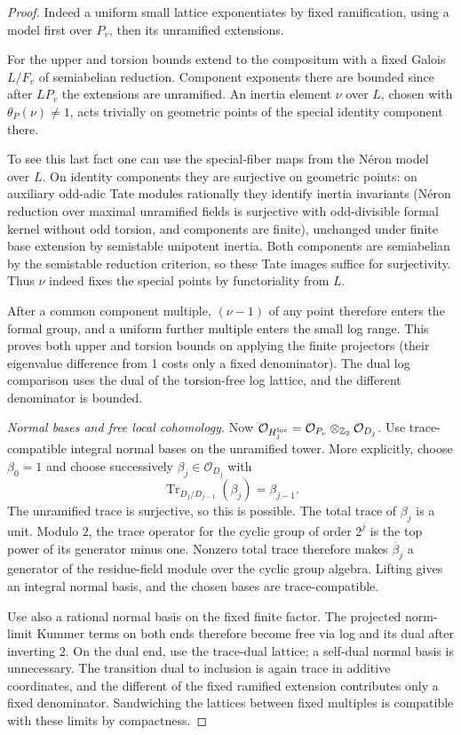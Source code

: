 \begin{proof}
Indeed a uniform small lattice exponentiates by fixed ramification, using a model first over \(P_v\), then its unramified extensions.

For the upper and torsion bounds extend to the compositum with a fixed Galois \(L/F_v\) of semiabelian reduction. Component exponents there are bounded since after \(LP_v\) the extensions are unramified. An inertia element \(\nu\) over \(L\), chosen with \(\theta_P(\nu)\ne1\), acts trivially on geometric points of the special identity component there.

To see this last fact one can use the special-fiber maps from the Néron model over \(L\). On identity components they are surjective on geometric points: on auxiliary odd-adic Tate modules rationally they identify inertia invariants (Néron reduction over maximal unramified fields is surjective with odd-divisible formal kernel without odd torsion, and components are finite), unchanged under finite base extension by semistable unipotent inertia. Both components are semiabelian by the semistable reduction criterion, so these Tate images suffice for surjectivity. Thus \(\nu\) indeed fixes the special points by functoriality from \(L\).

After a common component multiple, \((\nu-1)\) of any point therefore enters the formal group, and a uniform further multiple enters the small log range. This proves both upper and torsion bounds on applying the finite projectors (their eigenvalue difference from 1 costs only a fixed denominator). The dual log comparison uses the dual of the torsion-free log lattice, and the different denominator is bounded.

\smallskip\noindent\emph{Normal bases and free local cohomology.}
Now \(\mathcal O_{H_j^{\rm loc}}=\mathcal O_{P_v}\otimes_{\mathbb Z_2}\mathcal O_{D_j}\). Use trace-compatible integral normal bases on the unramified tower. More explicitly, choose \(\beta_0=1\) and choose successively \(\beta_j\in\mathcal O_{D_j}\) with
\[
 \operatorname{Tr}_{D_j/D_{j-1}}(\beta_j)=\beta_{j-1}.
\]
The unramified trace is surjective, so this is possible. The total trace of \(\beta_j\) is a unit. Modulo \(2\), the trace operator for the cyclic group of order \(2^j\) is the top power of its generator minus one. Nonzero total trace therefore makes \(\overline\beta_j\) a generator of the residue-field module over the cyclic group algebra. Lifting gives an integral normal basis, and the chosen bases are trace-compatible.

Use also a rational normal basis on the fixed finite factor. The projected norm-limit Kummer terms on both ends therefore become free via log and its dual after inverting \(2\). On the dual end, use the trace-dual lattice; a self-dual normal basis is unnecessary. The transition dual to inclusion is again trace in additive coordinates, and the different of the fixed ramified extension contributes only a fixed denominator. Sandwiching the lattices between fixed multiples is compatible with these limits by compactness.


\end{proof}
